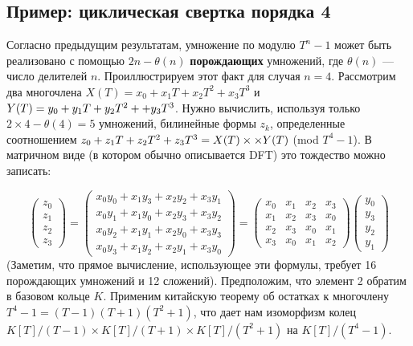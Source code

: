 \documentclass{mai_book}
\begin{document}
\subsection{Пример: циклическая свертка порядка 4}
Согласно предыдущим результатам, умножение по модулю $T^n - 1$ может быть реализовано с помощью $2n - \theta (n)$ \textbf{порождающих} умножений, где $\theta (n)$ --- число делителей $n$. Проиллюстрируем этот факт для случая $n = 4$. Рассмотрим два многочлена $X(T) = x_0 + x_1T + x_2T^2 + x_3T^3$ и $Y(T) = y_0 + y_1T + y_2T^2 +\linebreak+y_3T^3$. Нужно вычислить, используя только $2 \times 4 - \theta (4) = 5$ умножений, билинейные формы $z_k$, определенные соотношением $z_0 + z_1T + z_2T^2 + z_3T^3 = X(T) \times\linebreak \times Y(T)$ (mod $T^4 - 1$). В матричном виде (в котором обычно описывается D{\footnotesize FT}) это тождество можно записать:\par
$$
\begin{pmatrix} z_0 \\ z_1 \\ z_2 \\ z_3 \end{pmatrix} = \begin{pmatrix} x_0y_0 + x_1y_3 + x_2y_2 + x_3y_1 \\ x_0y_1 + x_1y_0 + x_2y_3 + x_3y_2 \\ x_0y_2 + x_1y_1 + x_2y_0 + x_3y_3 \\ x_0y_3 + x_1y_2 + x_2y_1 + x_3y_0 \end{pmatrix} = \begin{pmatrix} x_0 & x_1 & x_2 & x_3 \\ x_1 & x_2 & x_3 & x_0 \\ x_2 & x_3 & x_0 & x_1 \\ x_3 & x_0 & x_1 & x_2 \end{pmatrix} \begin{pmatrix} y_0 \\ y_3 \\ y_2 \\ y_1 \end{pmatrix}
$$
\noindent
(Заметим, что прямое вычисление, использующее эти формулы, требует 16 порождающих умножений и 12 сложений). Предположим, что элемент 2 обратим в базовом кольце $K$. Применим китайскую теорему об остатках к многочлену $T^4 - 1 = (T - 1)(T + 1)(T^2 + 1)$, что дает нам изоморфизм колец $K[T]/(T - 1) \times K[T]/(T + 1) \times K[T]/(T^2 + 1)$ на $K[T]/(T^4 - 1)$.\par 
\end{document}
